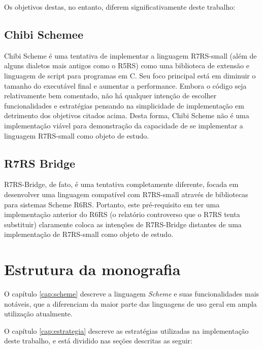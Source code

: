 Os objetivos destas, no entanto, diferem significativamente deste trabalho:

\subsection{Chibi Schemee}
\label{sub:chibi_scheme}

Chibi Scheme é uma tentativa de implementar a linguagem \acs{R7RS}-small (além de
alguns dialetos mais antigos como o \acs{R5RS}) como uma biblioteca de extensão e
linguagem de script para programas em C. Seu foco principal está em diminuir o
tamanho do executável final e aumentar a performance. Embora o código seja
relativamente bem comentado, não há qualquer intenção de escolher
funcionalidades e estratégias pensando na simplicidade de implementação em
detrimento dos objetivos citados acima. Desta forma, Chibi Scheme não é uma
implementação viável para demonstração da capacidade de se implementar a
linguagem \acs{R7RS}-small como objeto de estudo.


\subsection{\acs{R7RS} Bridge}
\label{sub:r7rs_bridge}

R7RS-Bridge, de fato, é uma tentativa completamente diferente, focada em
desenvolver uma linguagem compatível com \acs{R7RS}-small através de
bibliotecas para sistemas Scheme \acs{R6RS}. Portanto, este pré-requisito em
ter uma implementação anterior do \acs{R6RS} (o relatório controverso que o
\acs{R7RS} tenta substituir) claramente coloca as intenções de
\acs{R7RS}-Bridge distantes de uma implementação de \acs{R7RS}-small como objeto de
estudo.

\section{Estrutura da monografia}
\label{sec:estrutura_da_monografia}

O capítulo \ref{cap:scheme} descreve a linguagem \textit{Scheme} e suas
funcionalidades mais notáveis, que a diferenciam da maior parte das linguagens
de uso geral em ampla utilização atualmente.

O capítulo \ref{cap:estrategia} descreve as estratégias utilizadas na
implementação deste trabalho, e está dividido nas seções descritas as seguir:

